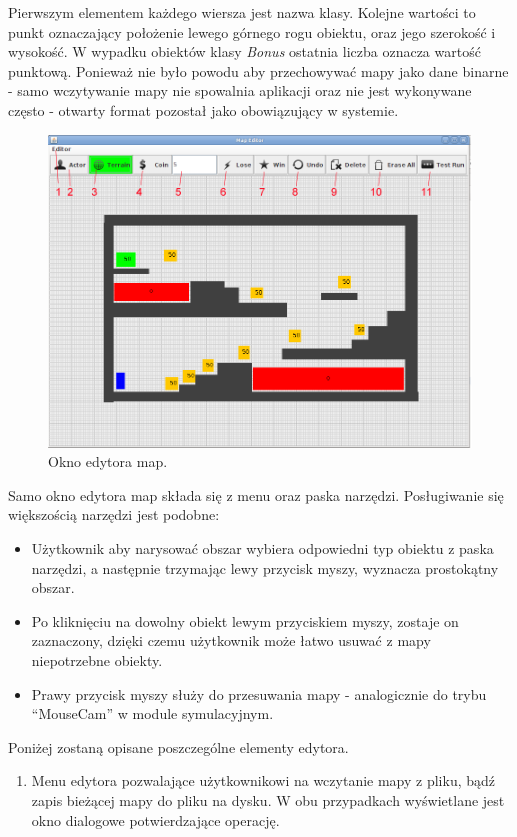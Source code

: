 \begin{par}
\begin{par}
	Pierwszym elementem każdego wiersza jest nazwa klasy.
	Kolejne wartości to punkt oznaczający położenie lewego górnego rogu obiektu, oraz jego szerokość i wysokość.
	W wypadku obiektów klasy \textit{Bonus} ostatnia liczba oznacza wartość punktową. 
	Ponieważ nie było powodu aby przechowywać mapy jako dane binarne - samo wczytywanie mapy nie spowalnia aplikacji oraz nie jest wykonywane często - otwarty format pozostał jako obowiązujący w systemie.
\end{par}
\begin{par}
	\begin{figure}[!h]
	\centering
	\includegraphics[width=5.5in]{obrazki/map_editor.png}
	\caption{Okno edytora map.}
	\label{fig:map_editor}
	\end{figure}
	Samo okno edytora map składa się z menu oraz paska narzędzi. Posługiwanie się większością narzędzi jest podobne:
	\begin{itemize}
	\item Użytkownik aby narysować obszar wybiera odpowiedni typ obiektu z paska narzędzi, a następnie trzymając lewy przycisk myszy, wyznacza prostokątny obszar.
	\item Po kliknięciu na dowolny obiekt lewym przyciskiem myszy, zostaje on zaznaczony, dzięki czemu użytkownik może łatwo usuwać z mapy niepotrzebne obiekty.
	\item Prawy przycisk myszy służy do przesuwania mapy - analogicznie do trybu ``MouseCam'' w module symulacyjnym.
	\end{itemize}
	Poniżej zostaną opisane poszczególne elementy edytora.
	\begin{enumerate}
		\item Menu edytora pozwalające użytkownikowi na wczytanie mapy z pliku, bądź zapis bieżącej mapy do pliku na dysku. W obu przypadkach wyświetlane jest okno dialogowe potwierdzające operację.

\end{enumerate}
\end{par}
\end{par}
